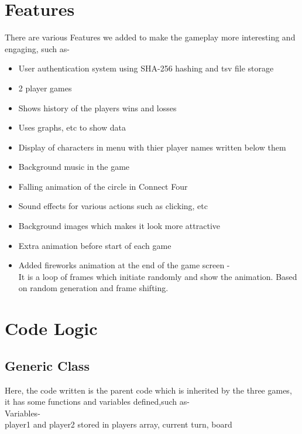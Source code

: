 \documentclass[12pt]{article}
\begin{document}
\section{Features}

There are various Features we added to make the gameplay more interesting and engaging, such as-

\begin{itemize}
    

\item User authentication system using SHA-256 hashing and tsv file storage
\item 2 player games
\item Shows history of the players wins and losses
\item Uses graphs, etc to show data
\item Display of characters in menu with thier player names written below them
\item Background music in the game
\item Falling animation of the circle in Connect Four
\item Sound effects for various actions such as clicking, etc
\item Background images which makes it look more attractive
\item Extra animation before start of each game
\item Added fireworks animation at the end of the game screen -\\ It is a loop of frames which initiate randomly and show the animation. Based on random generation and frame shifting.

\end{itemize}
\clearpage

\section{Code Logic}

\subsection{Generic Class}
Here, the code written is the parent code which is inherited by the three games, it has some functions and variables defined,such as-\\

Variables-\\
player1 and player2 stored in players array, current turn, board\\
\end{document}
